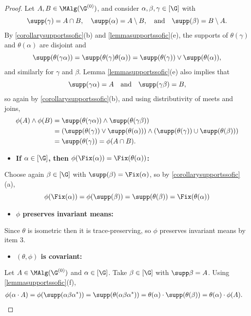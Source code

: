 \begin{proof}
Let $A,B\in\MAlg(\G^{(0)})$, and consider $\alpha,\beta,\gamma\in[\G]$ with
\[\supp(\gamma)=A\cap B,\quad \supp(\alpha)=A\setminus B,\quad\text{and}\quad\supp(\beta)=B\setminus A.\]
By \ref{corollarysupportssofic}(b) and \ref{lemmasupportssofic}(e), the supports of $\theta(\gamma)$ and $\theta(\alpha)$ are disjoint and
\[\supp(\theta(\gamma\alpha))=\supp(\theta(\gamma)\theta(\alpha))=\supp(\theta(\gamma))\lor\supp(\theta(\alpha)),\]
and similarly for $\gamma$ and $\beta$. Lemma \ref{lemmasupportssofic}(e) also implies that
\[\supp(\gamma\alpha)=A\quad\text{and}\quad\supp(\gamma\beta)=B,\]
so again by \ref{corollarysupportssofic}(b), and using distributivity of meets and joins,
\begin{align*}
\phi(A)\land\phi(B)&=\supp(\theta(\gamma\alpha))\land\supp(\theta(\gamma\beta))\\
&=\left(\supp(\theta(\gamma))\lor\supp(\theta(\alpha))\right)\land\left(\supp(\theta(\gamma))\cup\supp(\theta(\beta))\right)\\
&=\supp(\theta(\gamma))=\phi(A\cap B).
\end{align*}
%
\begin{itemize}
\item[3.]{\bf If $\alpha\in{[\G]}$, then $\phi(\Fix(\alpha))=\Fix(\theta(\alpha))$:}
\end{itemize}
Choose again $\beta\in[\G]$ with $\supp(\beta)=\Fix(\alpha)$, so by \ref{corollarysupportssofic}(a),
\[\phi(\Fix(\alpha))=\phi(\supp(\beta))=\supp(\theta(\beta))=\Fix(\theta(\alpha))\]
%
\begin{itemize}
\item[4.]{\bf$\phi$ preserves invariant means:}
\end{itemize}
Since $\theta$ is isometric then it is trace-preserving, so $\phi$ preserves invariant means by item 3.
\begin{itemize}
\item[5.]{\bf$(\theta,\phi)$ is covariant:}
\end{itemize}
Let $A\in\MAlg(\G^{(0)})$ and $\alpha\in[\G]$. Take $\beta\in[\G]$ with $\supp\beta=A$. Using \ref{lemmasupportssofic}(f),
\begin{align*}
\phi(\alpha\cdot A)&=\phi(\supp(\alpha\beta\alpha^*))=\supp(\theta(\alpha\beta\alpha^*))=\theta(\alpha)\cdot\supp(\theta(\beta))=\theta(\alpha)\cdot\phi(A).
\end{align*}


\end{proof}

